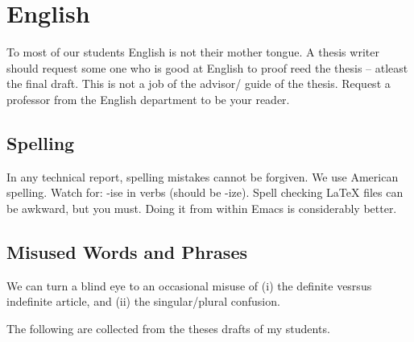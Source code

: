 \chapter{English}

To most of our students English is not their mother tongue.  A thesis
writer should request some one who is good at English to proof reed
the thesis -- atleast the final draft.  This is not a job of the
advisor/ guide of the thesis.  Request a professor from the English
department to be your reader.

\section{Spelling}

In any technical report, spelling mistakes cannot be forgiven.
We use American spelling.  Watch for: -ise in verbs (should be -ize).
Spell checking LaTeX files can be awkward, but you must.  Doing it
from within Emacs is considerably better.


\section{Misused Words and Phrases}

We can turn a blind eye to an occasional
misuse of (i) the definite vesrsus indefinite article, and (ii) the
singular/plural confusion.

The following are collected from the theses drafts of my students.

